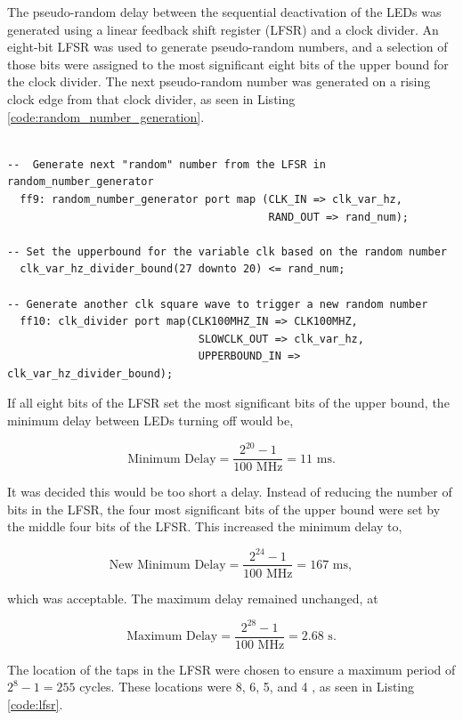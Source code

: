 \documentclass[12pt]{article}
\newenvironment{code}{\captionsetup{type=listing}}{}
\begin{document}
The pseudo-random delay between the sequential deactivation of the LEDs was generated using a linear feedback shift register (LFSR) and a clock divider. An eight-bit LFSR was used to generate pseudo-random numbers, and a selection of those bits were assigned to the most significant eight bits of the upper bound for the clock divider. The next pseudo-random number was generated on a rising clock edge from that clock divider, as seen in Listing \ref{code:random_number_generation}.

\begin{code}
\begin{verbatim}

--  Generate next "random" number from the LFSR in random_number_generator
  ff9: random_number_generator port map (CLK_IN => clk_var_hz,
                                         RAND_OUT => rand_num);
  
-- Set the upperbound for the variable clk based on the random number  
  clk_var_hz_divider_bound(27 downto 20) <= rand_num;

-- Generate another clk square wave to trigger a new random number
  ff10: clk_divider port map(CLK100MHZ_IN => CLK100MHZ,
                              SLOWCLK_OUT => clk_var_hz,
                              UPPERBOUND_IN => clk_var_hz_divider_bound);
\end{verbatim}
\captionsetup{belowskip=0pt}
\label{code:random_number_generation}
\end{code}

If all eight bits of the LFSR set the most significant bits of the upper bound, the minimum delay between LEDs turning off would be,

\[
\text{Minimum Delay} = \frac{2^{20} - 1}{100 \text{ MHz}} = 11 \text{ ms}.
\]

It was decided this would be too short a delay. Instead of reducing the number of bits in the LFSR, the four most significant bits of the upper bound were set by the middle four bits of the LFSR. This increased the minimum delay to,

\[
\text{New Minimum Delay} = \frac{2^{24} - 1}{100 \text{ MHz}} = 167\text{ ms},
\]

which was acceptable. The maximum delay remained unchanged, at

\[
\text{Maximum Delay} = \frac{2^{28} - 1}{100 \text{ MHz}} = 2.68 \text{ s}.
\]

The location of the taps in the LFSR were chosen to ensure a maximum period of $2^8 - 1 = 255$ cycles. These locations were 8, 6, 5, and 4 \cite{lfsr_taps}, as seen in Listing \ref{code:lfsr}.
\end{document}
